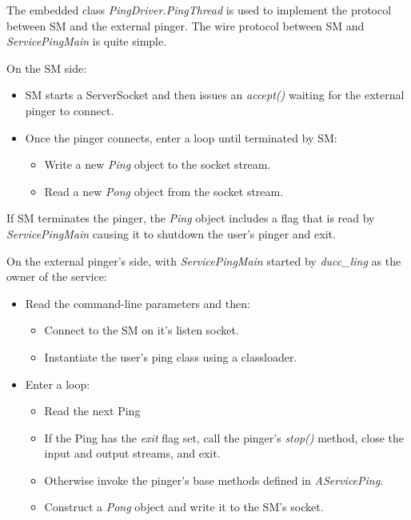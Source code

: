     The embedded class {\em PingDriver.PingThread} is used to implement the protocol between SM and
    the external pinger.   The wire protocol between SM and {\em ServicePingMain} is quite simple.

    On the SM side:
    \begin{itemize}
      \item SM starts a ServerSocket and then issues an {\em accept()} waiting for the external pinger to connect.
      \item Once the pinger connects, enter a loop until terminated by SM:
        \begin{itemize}
          \item Write a new {\em Ping} object to the socket stream.
          \item Read a new {\em Pong} object from the socket stream.
        \end{itemize}
    \end{itemize}
    
    If SM terminates the pinger, the {\em Ping} object includes a flag that is read by
    {\em ServicePingMain} causing it to shutdown the user's pinger and exit.

    On the external pinger's side, with {\em ServicePingMain} started by {\em ducc\_ling} as
    the owner of the service:
    \begin{itemize}
      \item Read the command-line parameters and then:
        \begin{itemize}
          \item Connect to the SM on it's listen socket.
          \item Instantiate the user's ping class using a classloader.
        \end{itemize}
      \item Enter a loop:
        \begin{itemize}
          \item Read the next Ping
          \item If the Ping has the {\em exit} flag set, call the pinger's {\em stop()} method, close the
            input and output streams, and exit.
          \item Otherwise invoke the pinger's base methods defined in {\em AServicePing}.
          \item Construct a {\em Pong} object and write it to the SM's socket.
        \end{itemize}
      \end{itemize}
    

